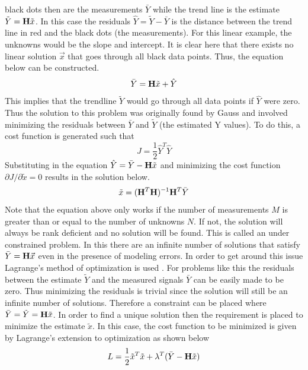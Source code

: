 \documentclass{article}
\begin{document}
black dots then are the measurements $\bar{Y}$ while the trend line is
the estimate $\tilde{Y} = {\bf H}\tilde{x}$. In this case the residuals
$\hat{Y} = \tilde{Y}-\bar{Y}$ is the distance between the trend line
in red and the black dots (the measurements). For this linear example,
the unknowns would be the slope and intercept. It is clear here that
there exists no linear solution $\vec{x}$ that goes through all black
data points. Thus, the equation below can be constructed.
\begin{equation}
  \bar{Y} = {\bf H}\tilde{x} + \hat{Y}
\end{equation}
This implies that the trendline $\tilde{Y}$ would go through all data
points if $\hat{Y}$ were zero. Thus the solution to this problem was
originally found by Gauss \cite{stigler1981} and involved minimizing
the residuals between $\bar{Y}$ and $\tilde{Y}$ (the estimated Y
values). To do this, a cost function is generated such that
\begin{equation}
  J = \frac{1}{2}\hat{Y}^T \hat{Y}
\end{equation}
Substituting in the equation $\hat{Y} = \bar{Y} - {\bf H}\tilde{x}$
and minimizing the cost function $\partial J/\partial \tilde{x} = 0$
results in the solution below.
\begin{equation}
  \tilde{x} = ({\bf H}^T{\bf H})^{-1}{\bf H}^T\bar{Y}
\end{equation}
Note that the equation above only works if the number of measurements $M$
is greater than or equal to the number of unknowns $N$. If not, the
solution will always be rank deficient and no solution will be
found. This is called an under constrained problem. In this there are
an infinite number of solutions that satisfy $\bar{Y} = {\bf
  H}\vec{x}$ even in the presence of modeling errors. In order
to get around this issue Lagrange's method of 
optimization is used \cite{lagrange}. For problems like this the
residuals between the estimate $\tilde{Y}$ and the measured signals
$\bar{Y}$ can be easily made to be zero. Thus minimizing the residuals
is trivial since the solution will still be an infinite number of
solutions. Therefore a constraint can be placed where
$\bar{Y}=\tilde{Y}={\bf H}\tilde{x}$. In order to find a unique
solution then the requirement is placed to minimize the estimate
$\tilde{x}$. In this case, the cost function
to be minimized is given by Lagrange's extension to optimization as
shown below
\begin{equation}
L = \frac{1}{2}\tilde{x}^T\tilde{x} + \lambda^T(\bar{Y}-{\bf H}\tilde{x})
\end{equation}
\end{document}
